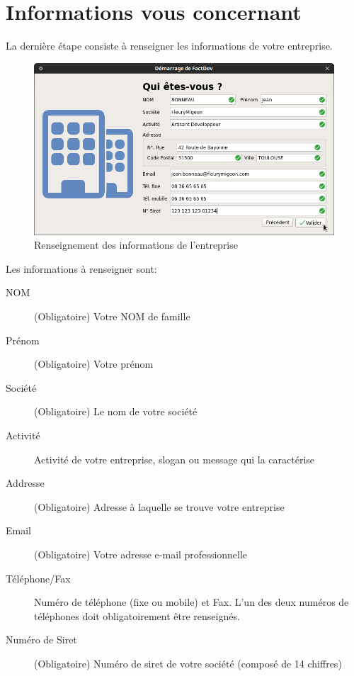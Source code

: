 \section{Informations vous concernant}
La derni\`ere \'etape consiste \`a renseigner les informations de votre entreprise. 
\begin{figure}[H]
	\centering
	\includegraphics[width=12cm]{screens/lancement3.png}
	\caption{Renseignement des informations de l'entreprise}
	\label{fig:renseignementInformationsEntreprise}
\end{figure}
Les informations \`a renseigner sont:
\begin{description}
	\item[NOM] (Obligatoire) Votre NOM de famille
	\item[Pr\'enom] (Obligatoire) Votre pr\'enom
	\item[Soci\'et\'e] (Obligatoire) Le nom de votre soci\'et\'e
	\item[Activit\'e] Activit\'e de votre entreprise, slogan ou message qui la caract\'erise
	\item[Addresse] (Obligatoire) Adresse \`a laquelle se trouve votre entreprise
	\item[Email] (Obligatoire) Votre adresse e-mail professionnelle
	\item[T\'el\'ephone/Fax] Num\'ero de t\'el\'ephone (fixe ou mobile) et Fax. L'un des deux num\'eros de t\'el\'ephones doit obligatoirement \^etre renseign\'es. 
	\item[Num\'ero de Siret] (Obligatoire) Num\'ero de siret de votre soci\'et\'e (compos\'e de 14 chiffres)
\end{description} 


















